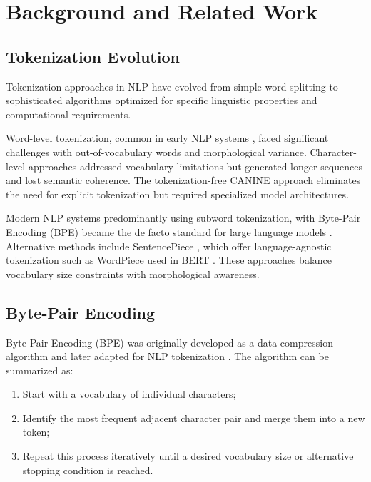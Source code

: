 \section{Background and Related Work}

\subsection{Tokenization Evolution}

Tokenization approaches in NLP have evolved from simple word-splitting \cite{webster1992tokenization} to sophisticated algorithms optimized for specific linguistic properties and computational requirements.\cite{mielke2021between}

Word-level tokenization, common in early NLP systems \cite{webster1992tokenization}, faced significant challenges with out-of-vocabulary words and morphological variance. Character-level approaches \cite{ma2x020charbert} addressed vocabulary limitations but generated longer sequences and lost semantic coherence. The tokenization-free CANINE approach \cite{clark2022canine} eliminates the need for explicit tokenization but required specialized model architectures.

Modern NLP systems predominantly using subword tokenization, with Byte-Pair Encoding (BPE) \cite{sennrich2016neural,gage1994new} became the de facto standard for large language models \cite{brown2020language}. Alternative methods include SentencePiece \cite{kudo2018sentencepiece}, which offer language-agnostic tokenization such as WordPiece used in BERT \cite{devlin2019bert}. These approaches balance vocabulary size constraints with morphological awareness.

\subsection{Byte-Pair Encoding}

Byte-Pair Encoding (BPE) was originally developed as a data compression algorithm \cite{gage1994new} and later adapted for NLP tokenization \cite{sennrich2016neural}. The algorithm can be summarized as:

\begin{enumerate}
    \item Start with a vocabulary of individual characters;
    \item Identify the most frequent adjacent character pair and merge them into a new token;
    \item Repeat this process iteratively until a desired vocabulary size or alternative stopping condition is reached.
\end{enumerate}

